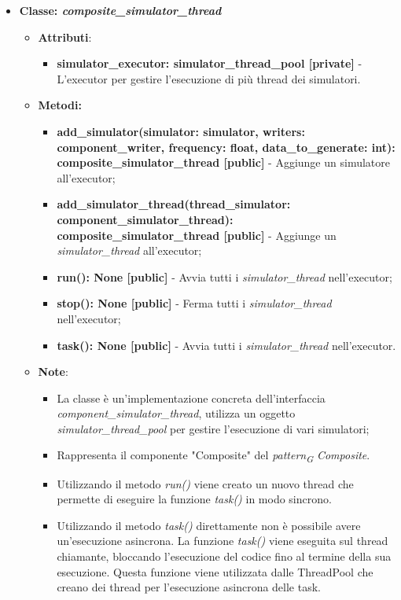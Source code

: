 \begin{itemize}
    \item{\textbf{Classe: \textit{composite\_simulator\_thread}}}
    \begin{itemize}
        \item\textbf{Attributi}:
        \begin{itemize}
            \item \textbf{simulator\_executor: simulator\_thread\_pool [private]} - L'executor per gestire l'esecuzione di più thread dei simulatori.
        \end{itemize}
        \item \textbf{Metodi: }
        \begin{itemize}
            \item \textbf{add\_simulator(simulator: simulator, writers: component\_writer, frequency: float, data\_to\_generate: int): composite\_simulator\_thread [public]} - Aggiunge un simulatore all'executor;
            \item \textbf{add\_simulator\_thread(thread\_simulator: component\_simulator\_thread): composite\_simulator\_thread [public]} - Aggiunge un \textit{simulator\_thread} all'executor;
            \item \textbf{run(): None [public]} - Avvia tutti i \textit{simulator\_thread} nell'executor;
            \item \textbf{stop(): None [public]} - Ferma tutti i \textit{simulator\_thread} nell'executor;
            \item \textbf{task(): None [public]} - Avvia tutti i \textit{simulator\_thread} nell'executor.
        \end{itemize}
        \item\textbf{Note}:
        \begin{itemize}
            \item La classe è un'implementazione concreta dell'interfaccia \textit{component\_simulator\_thread}, utilizza un oggetto \textit{simulator\_thread\_pool} per gestire l'esecuzione di vari simulatori;
            \item Rappresenta il componente "Composite" del \textit{pattern}\textsubscript{\textit{G}} \textit{Composite}.
            \item Utilizzando il metodo \textit{run()} viene creato un nuovo thread che permette di eseguire la funzione \textit{task()} in modo sincrono.
            \item Utilizzando il metodo \textit{task()} direttamente non è possibile avere un'esecuzione asincrona. La funzione \textit{task()} viene eseguita sul thread chiamante, bloccando l'esecuzione del codice fino al termine della sua esecuzione. Questa funzione viene utilizzata dalle ThreadPool che creano dei thread per l'esecuzione asincrona delle task.
        \end{itemize}
    \end{itemize}


\end{itemize}
